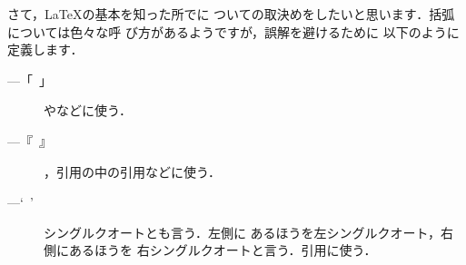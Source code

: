 {{{{{%
さて，{\LaTeX}の基本を知った所でに
ついての取決めをしたいと思います．括弧については色々な呼
び方があるようですが，誤解を避けるために
以下のように定義します．
\begin{description}
 \item[---「~」] 
	    やなどに使う．
 \item[---『~』] 
	    ，引用の中の引用などに使う．
 \item[---‘~’] シングルクオートとも言う．左側に
	    あるほうを左シングルクオート，右側にあるほうを
	    右シングルクオートと言う．引用に使う．

\end{description}}}}}}
